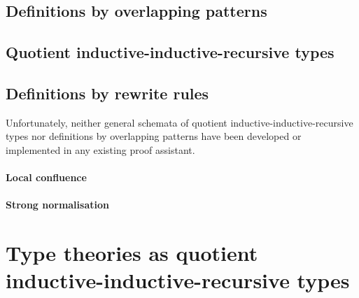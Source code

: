 \documentclass[a4paper,UKenglish,numberwithinsect,cleveref,thm-restate]{lipics-v2021}
\begin{document}
\subsection{Definitions by overlapping patterns}
\cite{Cockx2014,Altenkirch2016a}
\subsection{Quotient inductive-inductive-recursive types}
\subsection{Definitions by rewrite rules}
\cite{Cockx2020,Cockx2021}

Unfortunately, neither general schemata of quotient inductive-inductive-recursive types nor definitions by overlapping patterns have been developed or implemented in any existing proof assistant.

\paragraph*{Local confluence}
\paragraph*{Strong normalisation}


\section{Type theories as quotient inductive-inductive-recursive types} \label{sec:QIIRTs}
\end{document}
